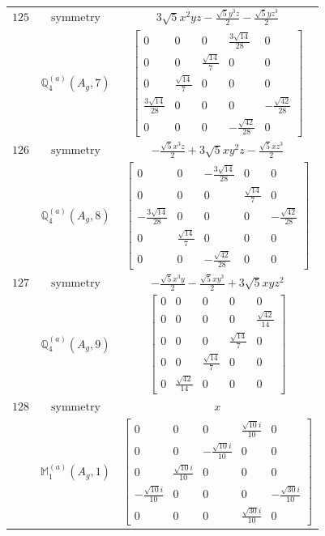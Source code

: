 \documentclass[fleqn,8pt,landscape]{jsarticle}
\begin{document}
\begin{longtable}{ccc}
$ 125 $ & $ \text{symmetry} $ & $ 3 \sqrt{5} x^{2} y z - \frac{\sqrt{5} y^{3} z}{2} - \frac{\sqrt{5} y z^{3}}{2} $ \\
$  $ & $ \mathbb{Q}_{4}^{(a)}(A_{g},7) $ & $ \begin{bmatrix} 0 & 0 & 0 & \frac{3 \sqrt{14}}{28} & 0 \\ 0 & 0 & \frac{\sqrt{14}}{7} & 0 & 0 \\ 0 & \frac{\sqrt{14}}{7} & 0 & 0 & 0 \\ \frac{3 \sqrt{14}}{28} & 0 & 0 & 0 & - \frac{\sqrt{42}}{28} \\ 0 & 0 & 0 & - \frac{\sqrt{42}}{28} & 0 \end{bmatrix} $ \\ \hline
$ 126 $ & $ \text{symmetry} $ & $ - \frac{\sqrt{5} x^{3} z}{2} + 3 \sqrt{5} x y^{2} z - \frac{\sqrt{5} x z^{3}}{2} $ \\
$  $ & $ \mathbb{Q}_{4}^{(a)}(A_{g},8) $ & $ \begin{bmatrix} 0 & 0 & - \frac{3 \sqrt{14}}{28} & 0 & 0 \\ 0 & 0 & 0 & \frac{\sqrt{14}}{7} & 0 \\ - \frac{3 \sqrt{14}}{28} & 0 & 0 & 0 & - \frac{\sqrt{42}}{28} \\ 0 & \frac{\sqrt{14}}{7} & 0 & 0 & 0 \\ 0 & 0 & - \frac{\sqrt{42}}{28} & 0 & 0 \end{bmatrix} $ \\ \hline
$ 127 $ & $ \text{symmetry} $ & $ - \frac{\sqrt{5} x^{3} y}{2} - \frac{\sqrt{5} x y^{3}}{2} + 3 \sqrt{5} x y z^{2} $ \\
$  $ & $ \mathbb{Q}_{4}^{(a)}(A_{g},9) $ & $ \begin{bmatrix} 0 & 0 & 0 & 0 & 0 \\ 0 & 0 & 0 & 0 & \frac{\sqrt{42}}{14} \\ 0 & 0 & 0 & \frac{\sqrt{14}}{7} & 0 \\ 0 & 0 & \frac{\sqrt{14}}{7} & 0 & 0 \\ 0 & \frac{\sqrt{42}}{14} & 0 & 0 & 0 \end{bmatrix} $ \\ \hline
$ 128 $ & $ \text{symmetry} $ & $ x $ \\
$  $ & $ \mathbb{M}_{1}^{(a)}(A_{g},1) $ & $ \begin{bmatrix} 0 & 0 & 0 & \frac{\sqrt{10} i}{10} & 0 \\ 0 & 0 & - \frac{\sqrt{10} i}{10} & 0 & 0 \\ 0 & \frac{\sqrt{10} i}{10} & 0 & 0 & 0 \\ - \frac{\sqrt{10} i}{10} & 0 & 0 & 0 & - \frac{\sqrt{30} i}{10} \\ 0 & 0 & 0 & \frac{\sqrt{30} i}{10} & 0 \end{bmatrix} $ \\ \hline

\end{longtable}
\end{document}
